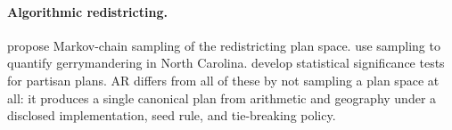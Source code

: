 \paragraph{Algorithmic redistricting.}
\citet{duchin2019gerrychain} propose Markov-chain sampling of the redistricting
plan space. \citet{herschlag2020quantifying} use sampling to quantify
gerrymandering in North Carolina. \citet{chikina2017assessing} develop
statistical significance tests for partisan plans. AR differs from all of
these by not sampling a plan space at all: it produces a single canonical
plan from arithmetic and geography under a disclosed implementation, seed
rule, and tie-breaking policy.
